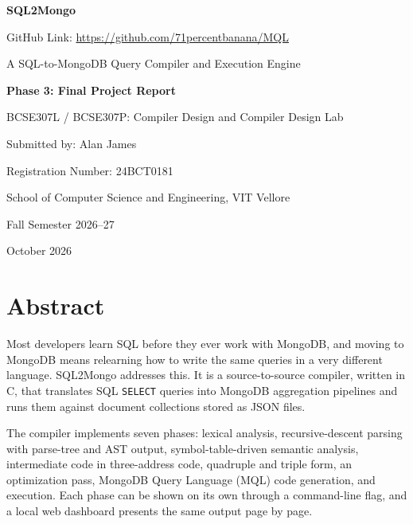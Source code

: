\documentclass[12pt,a4paper]{report}
\newcommand{\codeus}{\textunderscore\allowbreak}
\DeclareRobustCommand{\code}[1]{\texttt{\let\_\codeus #1}}
\begin{document}
\begin{titlepage}
\centering
{}
\vspace*{2.2cm}
{\fontsize{30}{36}\selectfont\bfseries SQL2Mongo\par}
\vspace{0.5cm}
{\normalsize GitHub Link: \url{https://github.com/71percentbanana/MQL}\par}
\vspace{1.4cm}
{\Large A SQL-to-MongoDB Query Compiler and Execution Engine\par}
\vspace{1.6cm}
{\large\bfseries Phase 3: Final Project Report\par}
\vspace{2.6cm}
{\large BCSE307L / BCSE307P: Compiler Design and Compiler Design Lab\par}
\vspace{1.4cm}
{\large Submitted by: Alan James\par}
{\large Registration Number: 24BCT0181\par}
\vfill
{\large School of Computer Science and Engineering, VIT Vellore\par}
{\large Fall Semester 2026--27\par}
\vspace{0.6cm}
{\large October 2026\par}
\end{titlepage}

\chapter*{Abstract}

Most developers learn SQL before they ever work with MongoDB, and moving to MongoDB means relearning how to write the same queries in a very different language. SQL2Mongo addresses this. It is a source-to-source compiler, written in C, that translates SQL \code{SELECT} queries into MongoDB aggregation pipelines and runs them against document collections stored as JSON files.

The compiler implements seven phases: lexical analysis, recursive-descent parsing with parse-tree and AST output, symbol-table-driven semantic analysis, intermediate code in three-address code, quadruple and triple form, an optimization pass, MongoDB Query Language (MQL) code generation, and execution. Each phase can be shown on its own through a command-line flag, and a local web dashboard presents the same output page by page.
\end{document}
